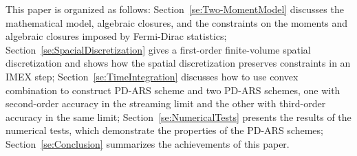 This paper is organized as follows: Section~\ref{se:Two-MomentModel} discusses the mathematical model, algebraic closures, and the constraints on the moments and algebraic closures imposed by Fermi-Dirac statistics;
Section~\ref{se:SpacialDiscretization} gives a first-order finite-volume spatial discretization and shows how the spatial discretization preserves constraints in an IMEX step;
Section~\ref{se:TimeIntegration} discusses how to use convex combination to construct PD-ARS scheme and two PD-ARS schemes, one with second-order accuracy in the streaming limit and the other with third-order accuracy in the same limit;
Section~\ref{se:NumericalTests} presents the results of the numerical tests, which demonstrate the properties of the PD-ARS schemes; Section~\ref{se:Conclusion} summarizes the achievements of this paper.